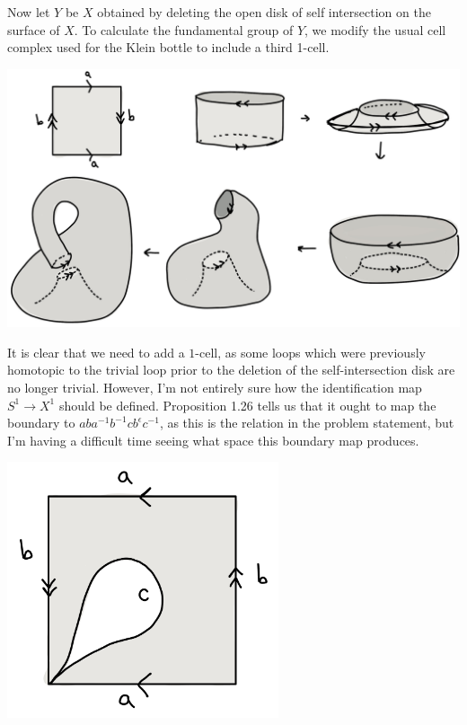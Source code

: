 \begin{homework}[e]
\begin{prf}
    Now let $Y$ be $X$ obtained by deleting the open disk of self intersection on the surface of $X$. To calculate the fundamental group of $Y$, we modify the usual cell complex used for the Klein bottle to include a third 1-cell. 
    \begin{center}
      \includegraphics[width=14cm]{figures/hwk4-fig7.png}
      \label{fig:prob1.2.12}
    \end{center}
    It is clear that we need to add a $1$-cell, as some loops which were previously homotopic to the trivial loop prior to the deletion of the self-intersection disk are no longer trivial. However, I'm not entirely sure how the identification map $S^1\to X^1$ should be defined. Proposition 1.26 tells us that it ought to map the boundary to $aba^{-1}b^{-1}cb^{\epsilon}c^{-1}$, as this is the relation in the problem statement, but I'm having a difficult time seeing what space this boundary map produces.
    \begin{center}
      \includegraphics[width=8cm]{figures/hwk4-fig8.png}
      \label{fig:prob1.2.12.1}
    \end{center}
  \end{prf}


\end{homework}
